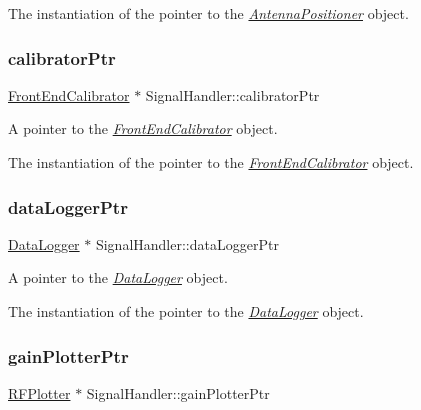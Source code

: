 The instantiation of the pointer to the {\itshape \hyperlink{classAntennaPositioner}{Antenna\+Positioner}} object. \mbox{\label{classSignalHandler_ae5bbe309adfefeb3b7e9ebf31d32b763}} 
\subsubsection{\texorpdfstring{calibrator\+Ptr}{calibratorPtr}}
{\footnotesize\ttfamily \hyperlink{classFrontEndCalibrator}{Front\+End\+Calibrator} $\ast$ Signal\+Handler\+::calibrator\+Ptr\hspace{0.3cm}{\ttfamily [static]}}



A pointer to the {\itshape \hyperlink{classFrontEndCalibrator}{Front\+End\+Calibrator}} object. 

The instantiation of the pointer to the {\itshape \hyperlink{classFrontEndCalibrator}{Front\+End\+Calibrator}} object. \mbox{\label{classSignalHandler_a114e600bdc2ad95efbc2991c97f3732c}} 
\subsubsection{\texorpdfstring{data\+Logger\+Ptr}{dataLoggerPtr}}
{\footnotesize\ttfamily \hyperlink{classDataLogger}{Data\+Logger} $\ast$ Signal\+Handler\+::data\+Logger\+Ptr\hspace{0.3cm}{\ttfamily [static]}}



A pointer to the {\itshape \hyperlink{classDataLogger}{Data\+Logger}} object. 

The instantiation of the pointer to the {\itshape \hyperlink{classDataLogger}{Data\+Logger}} object. \mbox{\label{classSignalHandler_a040fa3711d4239933dd28a00b24965b2}} 
\subsubsection{\texorpdfstring{gain\+Plotter\+Ptr}{gainPlotterPtr}}
{\footnotesize\ttfamily \hyperlink{classRFPlotter}{R\+F\+Plotter} $\ast$ Signal\+Handler\+::gain\+Plotter\+Ptr\hspace{0.3cm}{\ttfamily [static]}}



